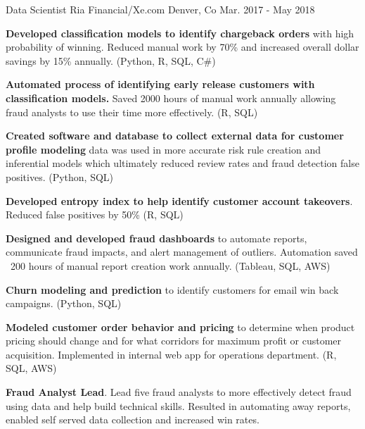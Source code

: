 \begin{cventries}
  \cventry
    {Data Scientist} %
    {Ria Financial/Xe.com} %
    {Denver, Co} %
    {Mar. 2017 - May 2018} %
    {
      \begin{cvitems} %
        \item {\textbf{Developed classification models to identify chargeback orders} with high probability of winning. Reduced manual work by 70\% and increased overall dollar savings by 15\% annually. (Python, R, SQL, C\#)}
        \item {\textbf{Automated process of identifying early release customers with classification models.} Saved 2000 hours of manual work annually allowing fraud analysts to use their time more effectively. (R, SQL)}
        \item {\textbf{Created software and database to collect external data for customer profile modeling} data was used in more accurate risk rule creation and inferential models which ultimately reduced review rates and fraud detection false positives. (Python, SQL)}
        \item {\textbf{Developed entropy index to help identify customer account takeovers}. Reduced false positives by 50\% (R, SQL)}
        \item {\textbf{Designed and developed fraud dashboards} to automate reports, communicate fraud impacts, and alert management of outliers. Automation saved ~200 hours of manual report creation work annually. (Tableau, SQL, AWS)}
        \item {\textbf{Churn modeling and prediction} to identify customers for email win back campaigns. (Python, SQL)}
        \item {\textbf{Modeled customer order behavior and pricing} to determine when product pricing should change and for what corridors for maximum profit or customer acquisition. Implemented in internal web app for operations department. (R, SQL, AWS)}
        \item {\textbf{Fraud Analyst Lead}. Lead five fraud analysts to more effectively detect fraud using data and help build technical skills. Resulted in automating away reports, enabled self served data collection and increased win rates. }
      \end{cvitems}
    }


\end{cventries}
